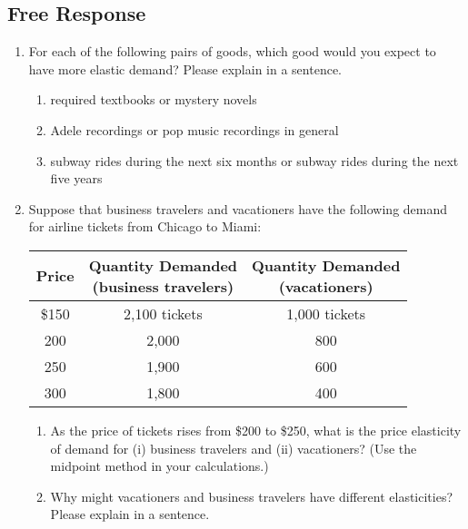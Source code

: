 \documentclass{article}
\begin{document}
\subsection*{Free Response}

\begin{enumerate}

\item For each of the following pairs of goods, which good would you expect to have more elastic demand? Please explain in a sentence.

	\begin{enumerate}
	
	\item required textbooks or mystery novels
	
	\item Adele recordings or pop music recordings in general
	
	\item subway rides during the next six months or subway rides during the next five years
	
	\end{enumerate}

\item Suppose that business travelers and vacationers have the following demand for airline tickets from Chicago to Miami:

	\begin{center}
	\begin{tabular}{c | c | c}
	\textbf{Price} & \makecell{\textbf{Quantity Demanded} \\ \textbf{(business travelers)}} & \makecell{\textbf{Quantity Demanded} \\ \textbf{(vacationers)}} \\
	\hline
	\$150 & 2,100 tickets & 1,000 tickets \\
	200 & 2,000 & 800 \\
	250 & 1,900 & 600 \\
	300 & 1,800 & 400 
	\end{tabular}
	\end{center}
	
	\begin{enumerate}
	
	\item As the price of tickets rises from \$200 to \$250, what is the price elasticity of demand for (i) business travelers and (ii) vacationers? (Use the midpoint method in your calculations.)
	
	\item Why might vacationers and business travelers have different elasticities? Please explain in a sentence.
	

\end{enumerate}
\end{enumerate}
\end{document}
